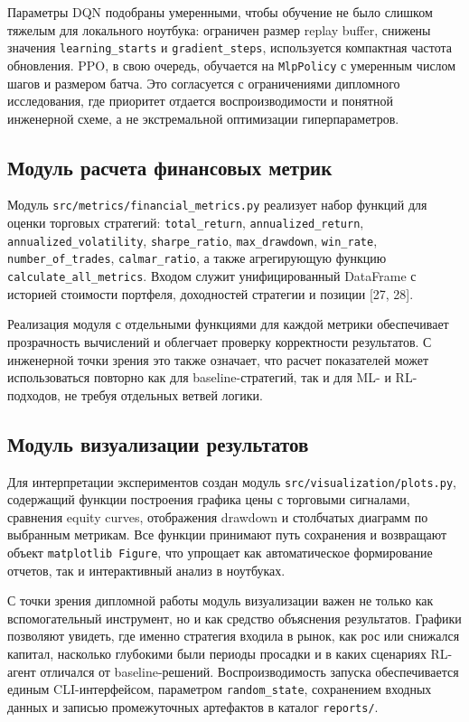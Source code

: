 Параметры DQN подобраны умеренными, чтобы обучение не было слишком тяжелым для локального ноутбука: ограничен размер replay buffer, снижены значения \texttt{learning\_starts} и \texttt{gradient\_steps}, используется компактная частота обновления. PPO, в свою очередь, обучается на \texttt{MlpPolicy} с умеренным числом шагов и размером батча. Это согласуется с ограничениями дипломного исследования, где приоритет отдается воспроизводимости и понятной инженерной схеме, а не экстремальной оптимизации гиперпараметров.

\subsection{Модуль расчета финансовых метрик}

Модуль \texttt{src/metrics/financial\_metrics.py} реализует набор функций для оценки торговых стратегий: \texttt{total\_return}, \texttt{annualized\_return}, \texttt{annualized\_volatility}, \texttt{sharpe\_ratio}, \texttt{max\_drawdown}, \texttt{win\_rate}, \texttt{number\_of\_trades}, \texttt{calmar\_ratio}, а также агрегирующую функцию \texttt{calculate\_all\_metrics}. Входом служит унифицированный DataFrame с историей стоимости портфеля, доходностей стратегии и позиции [27, 28].

Реализация модуля с отдельными функциями для каждой метрики обеспечивает прозрачность вычислений и облегчает проверку корректности результатов. С инженерной точки зрения это также означает, что расчет показателей может использоваться повторно как для baseline-стратегий, так и для ML- и RL-подходов, не требуя отдельных ветвей логики.

\subsection{Модуль визуализации результатов}

Для интерпретации экспериментов создан модуль \texttt{src/visualization/plots.py}, содержащий функции построения графика цены с торговыми сигналами, сравнения equity curves, отображения drawdown и столбчатых диаграмм по выбранным метрикам. Все функции принимают путь сохранения и возвращают объект \texttt{matplotlib Figure}, что упрощает как автоматическое формирование отчетов, так и интерактивный анализ в ноутбуках.

С точки зрения дипломной работы модуль визуализации важен не только как вспомогательный инструмент, но и как средство объяснения результатов. Графики позволяют увидеть, где именно стратегия входила в рынок, как рос или снижался капитал, насколько глубокими были периоды просадки и в каких сценариях RL-агент отличался от baseline-решений. Воспроизводимость запуска обеспечивается единым CLI-интерфейсом, параметром \texttt{random\_state}, сохранением входных данных и записью промежуточных артефактов в каталог \texttt{reports/}.

